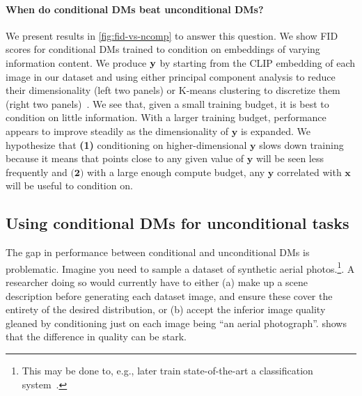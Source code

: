 \paragraph{When do conditional DMs beat unconditional DMs?}
%
We present results in \cref{fig:fid-vs-ncomp} to answer this question. We show FID scores for conditional DMs trained to condition on embeddings of varying information content. 
%
We produce ${\mathbf{y}}$ by starting from the CLIP embedding of each image in our dataset and using either principal component analysis to reduce their dimensionality (left two panels) or K-means clustering to discretize them (right two panels)~\citep{hu2022self}.
%
We see that, given a small training budget, it is best to condition on little information. With a larger training budget, performance appears to improve steadily as the dimensionality of $\mathbf{y}$ is expanded. We hypothesize that \textbf{(1)} conditioning on higher-dimensional $\mathbf{y}$ slows down training because it means that points close to any given value of $\mathbf{y}$ will be seen less frequently and $\textbf{(2)}$ with a large enough compute budget, any $\mathbf{y}$ correlated with $\mathbf{x}$ will be useful to condition on.



\subsection{Using conditional DMs for unconditional tasks} \label{sec:2sdm-2sdm-method}

The gap in performance between conditional and unconditional DMs is problematic. Imagine you need to sample a dataset of synthetic aerial photos.\footnote{ This may be done to, e.g., later train state-of-the-art a classification system~\citep{azizi2023synthetic}.}. A researcher doing so would currently have to either (a) make up a scene description before generating each dataset image, and ensure these cover the entirety of the desired distribution, or (b) accept the inferior image quality gleaned by conditioning just on each image being ``an aerial photograph''.   shows that the difference in quality can be stark.

